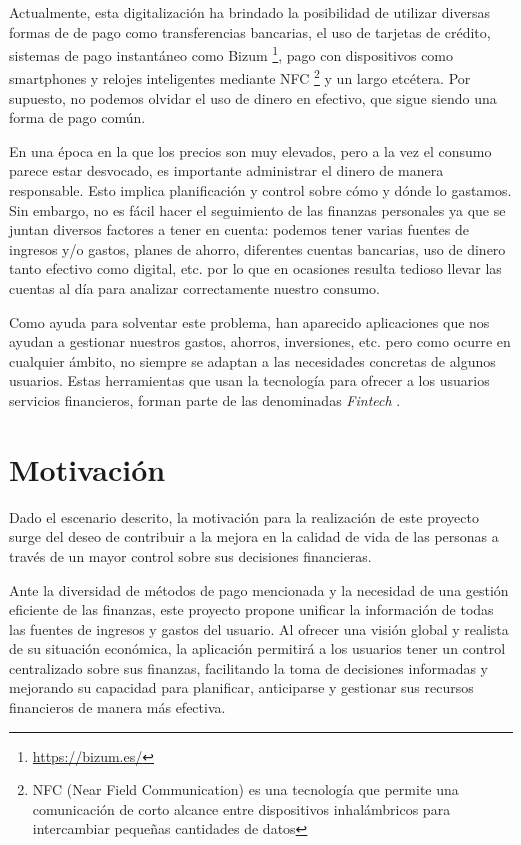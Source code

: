 Actualmente, esta digitalización ha brindado la posibilidad de utilizar diversas formas de de pago como transferencias bancarias, el uso de tarjetas de crédito, sistemas de pago instantáneo como Bizum \footnote{\url{https://bizum.es/}}, pago con dispositivos como smartphones y relojes inteligentes mediante NFC \footnote{NFC (Near Field Communication) es una tecnología que permite una comunicación de corto alcance entre dispositivos inhalámbricos para intercambiar pequeñas cantidades de datos} y un largo etcétera. Por supuesto, no podemos olvidar el uso de dinero en efectivo, que sigue siendo una forma de pago común. 

En una época en la que los precios son muy elevados, pero a la vez el consumo parece estar desvocado, es importante administrar el dinero de manera responsable. Esto implica planificación y control sobre cómo y dónde lo gastamos.
Sin embargo, no es fácil hacer el seguimiento de las finanzas personales ya que se 
juntan diversos factores a tener en cuenta: podemos tener varias fuentes de ingresos y/o 
gastos, planes de ahorro, diferentes cuentas bancarias, uso de dinero tanto 
efectivo como digital, etc. por lo que en ocasiones resulta tedioso 
llevar las cuentas al día para analizar correctamente nuestro consumo.

Como ayuda para solventar este problema, han aparecido aplicaciones que nos ayudan a gestionar nuestros gastos, ahorros, inversiones, etc. pero como ocurre en cualquier ámbito, no siempre se adaptan a las necesidades concretas de algunos usuarios. Estas herramientas que usan la tecnología para ofrecer a los usuarios servicios financieros, forman parte de las denominadas \textit{Fintech} \cite{schueffel2016taming}.

\section{Motivación}
Dado el escenario descrito, la motivación para la realización de este proyecto surge del deseo de contribuir a la mejora en la calidad de vida de las personas a través de un mayor control sobre sus decisiones financieras. 

Ante la diversidad de métodos de pago mencionada y la necesidad de una gestión eficiente de las finanzas, este proyecto propone unificar la información de todas las fuentes de ingresos y gastos del usuario. Al ofrecer una visión global y realista de su situación económica, la aplicación permitirá a los usuarios tener un control centralizado sobre sus finanzas, facilitando la toma de decisiones informadas y mejorando su capacidad para planificar, anticiparse y gestionar sus recursos financieros de manera más efectiva.

